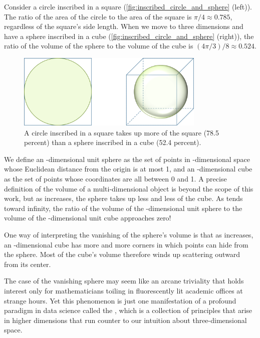 Consider a circle inscribed in a square (\autoref{fig:inscribed_circle_and_sphere} (left)). The ratio of the area of the circle to the area of the square is $\pi/4 \approx 0.785$, regardless of the square's side length. When we move to three dimensions and have a sphere inscribed in a cube (\autoref{fig:inscribed_circle_and_sphere} (right)), the ratio of the volume of the sphere to the volume of the cube is $(4\pi/3)/8 \approx 0.524$.\\

\begin{figure}[h]
\centering
\mySfFamily
\includegraphics[width = 0.8\textwidth]{../images/inscribed_circle_and_sphere.png}
\caption{A circle inscribed in a square takes up more of the square (78.5 percent) than a sphere inscribed in a cube (52.4 percent).}
\label{fig:inscribed_circle_and_sphere}
\end{figure}

We define an -dimensional unit sphere as the set of points in -dimensional space whose Euclidean distance from the origin is at most 1, and an -dimensional cube as the set of points whose coordinates are all between 0 and 1. A precise definition of the volume of a multi-dimensional object is beyond the scope of this work, but as  increases, the sphere takes up less and less of the cube. As  tends toward infinity, the ratio of the volume of the -dimensional unit sphere to the volume of the -dimensional unit cube approaches zero!

One way of interpreting the vanishing of the sphere's volume is that as  increases, an -dimensional cube has more and more corners in which points can hide from the sphere. Most of the cube's volume therefore winds up scattering outward from its center.

The case of the vanishing sphere may seem like an arcane triviality that holds interest only for mathematicians toiling in fluorescently lit academic offices at strange hours. Yet this phenomenon is just one manifestation of a profound paradigm in data science called the , which is a collection of principles that arise in higher dimensions that run counter to our intuition about three-dimensional space.

